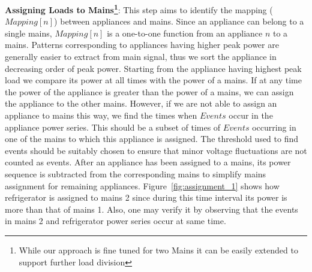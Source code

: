 \documentclass[conference]{IEEEtran}
\newcommand{\figref}[1]{Figure~\ref{#1}}
\begin{document}
\noindent\textbf{Assigning Loads to Mains\footnote{While our approach is fine tuned for two Mains it can be easily extended to support further load division}}:
This step aims to identify the mapping ($Mapping[n]$) between appliances and mains. Since an appliance can belong to a single mains, $Mapping[n]$ is a one-to-one function from an appliance $n$ to a mains. Patterns corresponding to appliances having higher peak power are generally easier to extract from main signal, thus we sort the appliance in decreasing order of peak power. Starting from the appliance having highest peak load we compare its power at all times with the power of a mains. If at any time the power of the appliance is greater than the power of a mains, we can assign the appliance to the other mains. However, if we are not able to assign an appliance to mains this way, we find the times when $Events$ occur in the appliance power series. This should be a subset of times of $Events$ occurring in one of the mains to which this appliance is assigned. The threshold used to find events should be suitably chosen to ensure that minor voltage fluctuations are not counted as events. After an appliance has been assigned to a mains, its power sequence is subtracted from the corresponding mains to simplify mains assignment for remaining appliances. \figref{fig:assignment_1} shows how refrigerator is assigned to mains 2 since during this time interval its power is more than that of mains 1. Also, one may verify it by observing that the events in mains 2 and refrigerator power series occur at same time.
\end{document}
